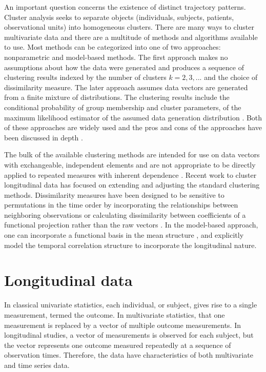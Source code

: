 An important question concerns the existence of distinct trajectory patterns. Cluster analysis seeks to separate objects (individuals, subjects, patients, observational units) into homogeneous clusters. There are many ways to cluster multivariate data and there are a multitude of methods and algorithms available to use. Most methods can be categorized into one of two approaches: nonparametric and model-based methods. The first approach makes no assumptions about how the data were generated and produces a sequence of clustering results indexed by the number of clusters $k=2,3,...$ and the choice of dissimilarity measure. The later approach assumes data vectors are generated from a finite mixture of distributions. The clustering results include the conditional probability of group membership and cluster parameters, of the maximum likelihood estimator of the assumed data generation distribution \cite{mclachlan2000,fraley1998}. Both of these approaches are widely used and the pros and cons of the approaches have been discussed in depth \cite{magidson2002, everitt1981}.

The bulk of the available clustering methods are intended for use on data vectors with exchangeable, independent elements and are not appropriate to be directly applied to repeated measures with inherent dependence \cite{everitt2009}. Recent work to cluster longitudinal data has focused on extending and adjusting the standard clustering methods. Dissimilarity measures have been designed to be sensitive to permutations in the time order by incorporating the relationships between neighboring observations \cite{chouakria2007} or calculating dissimilarity between coefficients of a functional projection rather than the raw vectors \cite{serban2005, tarpey2003, abraham2003, tarpey2007,hitchcock2007}. In the model-based approach, one can incorporate a functional basis in the mean structure \cite{nagin1999,gaffney1999}, and explicitly model the temporal correlation structure \cite{muthen1999,fraley1999,mcnicholas2010} to incorporate the longitudinal nature. 

\section{Longitudinal data}
In classical univariate statistics, each individual, or subject, gives rise to a single measurement, termed the outcome. In multivariate statistics, that one measurement is replaced by a vector of multiple outcome measurements. In longitudinal studies, a vector of measurements is observed for each subject, but the vector represents one outcome measured repeatedly at a sequence of observation times. Therefore, the data have characteristics of both multivariate and time series data.

